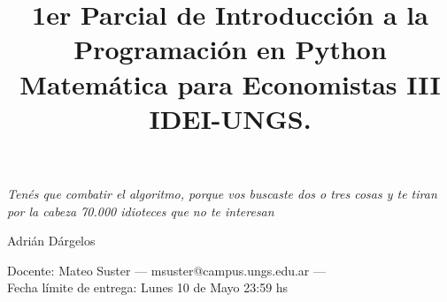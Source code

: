 \documentclass[a4paper,11pt]{article}
\title{1er Parcial de Introducción a la Programación en Python\\ Matemática para Economistas III \\ IDEI-UNGS.}
\begin{document}
\maketitle
\epigraph{\itshape Tenés que combatir el algoritmo, porque vos buscaste dos o tres cosas y te tiran por la cabeza 70.000 idioteces que no te interesan}{Adrián Dárgelos }	

\noindent Docente: Mateo Suster --- msuster@campus.ungs.edu.ar --- \\
Fecha límite de entrega: Lunes 10 de Mayo 23:59 hs

\end{document}

